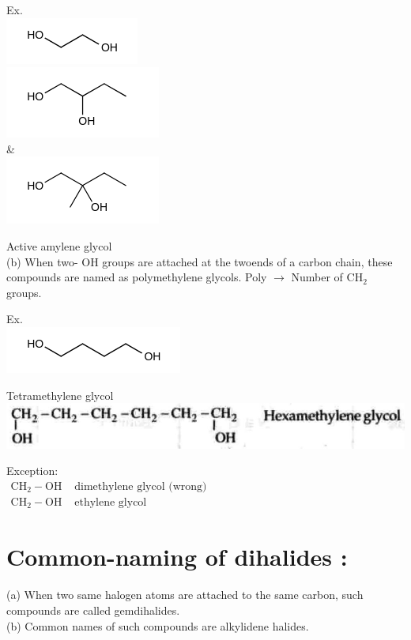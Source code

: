 \documentclass[10pt]{article}
\begin{document}
Ex.\\
\includegraphics{smile-23106b9615eab6e0b06ce595e3dffea3e5e5cd10}\\
\includegraphics{smile-9ce4db110eee62cad2703ce80d5401f3f965d2e5}\\
\&\\
\includegraphics{smile-ef2f748282dc31c51d4d6784a52b9beddcb6f328}

Active amylene glycol\\
(b) When two- OH groups are attached at the twoends of a carbon chain, these compounds are named as polymethylene glycols. Poly $\rightarrow$ Number of $\mathrm{CH}_{2}$ groups.

Ex.\\
\includegraphics{smile-882817cae275d70c1ccdfdd38312cb540a8c4564}

Tetramethylene glycol\\
\includegraphics[max width=\textwidth, center]{2025_01_28_8470952b98110cec3aabg-013}

Exception:\\
$\begin{array}{ll}\mathrm{CH}_{2}-\mathrm{OH} & \text { dimethylene glycol (wrong) } \\ \mathrm{CH}_{2}-\mathrm{OH} & \text { ethylene glycol }\end{array}$

\section*{Common-naming of dihalides :}
(a) When two same halogen atoms are attached to the same carbon, such compounds are called gemdihalides.\\
(b) Common names of such compounds are alkylidene halides.
\end{document}
